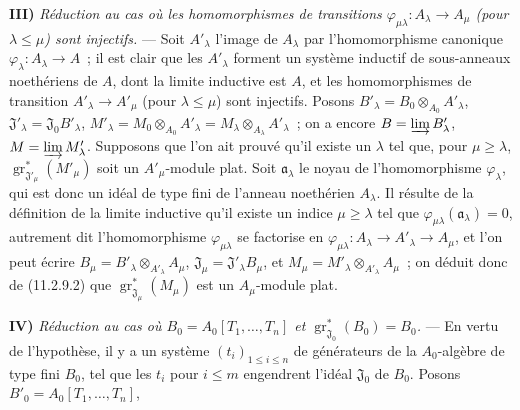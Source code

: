 \medskip
\noindent\textbf{III)} \emph{Réduction au cas où les homomorphismes de
transitions $\varphi_{\mu\lambda}:A_\lambda\to A_\mu$ (pour
$\lambda\leq\mu$) sont injectifs.} --- Soit $A'_\lambda$ l'image de
$A_\lambda$ par l'homomorphisme canonique $\varphi_\lambda:A_\lambda\to A$~;
il est clair que les $A'_\lambda$ forment un système inductif de sous-anneaux
noethériens de $A$, dont la limite inductive est $A$, et les homomorphismes de
transition $A'_\lambda\to A'_\mu$ (pour $\lambda\leq\mu$) sont injectifs.
Posons $B'_\lambda=B_0\otimes_{A_0}A'_\lambda$,
$\mathfrak J'_\lambda=\mathfrak J_0B'_\lambda$,
$M'_\lambda=M_0\otimes_{A_0}A'_\lambda=M_\lambda\otimes_{A_\lambda}A'_\lambda$~;
on a encore $B=\varinjlim B'_\lambda$, $M=\varinjlim M'_\lambda$. Supposons
que l'on ait prouvé qu'il existe un $\lambda$ tel que, pour $\mu\geq\lambda$,
$\operatorname{gr}_{\mathfrak J'_\mu}^*(M'_\mu)$ soit un $A'_\mu$-module
plat. Soit $\mathfrak a_\lambda$ le noyau de l'homomorphisme $\varphi_\lambda$,
qui est donc un idéal de type fini de l'anneau noethérien $A_\lambda$. Il
résulte de la définition de la limite inductive qu'il existe un indice
$\mu\geq\lambda$ tel que $\varphi_{\mu\lambda}(\mathfrak a_\lambda)=0$,
autrement dit l'homomorphisme $\varphi_{\mu\lambda}$ se factorise en
$\varphi_{\mu\lambda}:A_\lambda\to A'_\lambda\to A_\mu$, et l'on peut écrire
$B_\mu=B'_\lambda\otimes_{A'_\lambda}A_\mu$,
$\mathfrak J_\mu=\mathfrak J'_\lambda B_\mu$, et
$M_\mu=M'_\lambda\otimes_{A'_\lambda}A_\mu$~; on déduit donc de (11.2.9.2)
que $\operatorname{gr}_{\mathfrak J_\mu}^*(M_\mu)$ est un $A_\mu$-module
plat.

\medskip
\noindent\textbf{IV)} \emph{Réduction au cas où
$B_0=A_0[T_1,\ldots,T_n]$ et
$\operatorname{gr}_{\mathfrak J_0}^*(B_0)=B_0$.} --- En vertu de l'hypothèse,
il y a un système $(t_i)_{1\leq i\leq n}$ de générateurs de la $A_0$-algèbre
de type fini $B_0$, tel que les $t_i$ pour $i\leq m$ engendrent l'idéal
$\mathfrak J_0$ de $B_0$. Posons $B'_0=A_0[T_1,\ldots,T_n]$,


